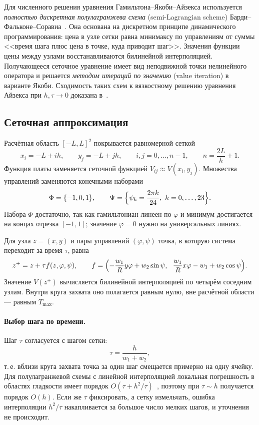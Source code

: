 \documentclass[14pt,a4paper]{extarticle}
\begin{document}
	Для численного решения уравнения Гамильтона--Якоби--Айзекса используется \emph{полностью дискретная полулагранжева схема} (semi-Lagrangian scheme) Барди--Фальконе--Соравиа~\cite{bfs,ff}. Она основана на дискретном принципе динамического программирования: цена в узле сетки равна минимаксу по управлениям от суммы <<время шага плюс цена в точке, куда приводит шаг>>. Значения функции цены между узлами восстанавливаются билинейной интерполяцией. Получающееся сеточное уравнение имеет вид неподвижной точки нелинейного оператора и решается \emph{методом итераций по значению} (value iteration) в варианте Якоби. Сходимость таких схем к вязкостному решению уравнения Айзекса при $h,\tau\to 0$ доказана в~\cite{bfs,bcd}.

	\subsection{Сеточная аппроксимация}

	Расчётная область $[-L,L]^2$ покрывается равномерной сеткой
	\[
	x_i=-L+ih,\qquad y_j=-L+jh,\qquad i,j=0,\dots,n-1,\qquad n=\frac{2L}{h}+1 .
	\]
	Функция платы заменяется сеточной функцией $V_{ij}\approx V(x_i,y_j)$. Множества управлений заменяются конечными наборами
	\[
	\Phi=\{-1,0,1\},\qquad \Psi=\Bigl\{\psi_k=\frac{2\pi k}{24},\ k=0,\dots,23\Bigr\}.
	\]
	Набора $\Phi$ достаточно, так как гамильтониан линеен по $\varphi$ и минимум достигается на концах отрезка $[-1,1]$; значение $\varphi = 0$ нужно на универсальных линиях.

	Для узла $z=(x,y)$ и пары управлений $(\varphi,\psi)$ точка, в которую система переходит за время $\tau$, равна
	\[
	z^{+}=z+\tau f(z,\varphi,\psi),\qquad
	f=\Bigl(-\frac{w_1}{R}y\varphi+w_2\sin\psi,\ \ \frac{w_1}{R}x\varphi-w_1+w_2\cos\psi\Bigr).
	\]
	Значение $V(z^{+})$ вычисляется билинейной интерполяцией по четырём соседним узлам. Внутри круга захвата оно полагается равным нулю, вне расчётной области --- равным $T_{\max}$.

	\paragraph{Выбор шага по времени.} Шаг $\tau$ согласуется с шагом сетки:
	\[
	\tau=\frac{h}{w_1+w_2},
	\]
	т.\,е. вблизи круга захвата точка за один шаг смещается примерно на одну ячейку. Для полулагранжевой схемы с линейной интерполяцией локальная погрешность в областях гладкости имеет порядок $O(\tau+h^2/\tau)$~\cite{ff}, поэтому при $\tau\sim h$ получается порядок $O(h)$. Если же $\tau$ фиксировать, а сетку измельчать, ошибка интерполяции $h^2/\tau$ накапливается за большое число мелких шагов, и уточнения не происходит.
\end{document}
